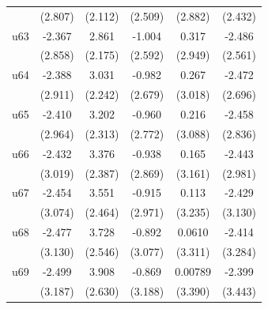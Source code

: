 \begin{table}[htbp]
\begin{tabular}{l*{5}{c}}
                    &     (2.807)         &     (2.112)         &     (2.509)         &     (2.882)         &     (2.432)         \\
\addlinespace
u63                 &      -2.367         &       2.861         &      -1.004         &       0.317         &      -2.486         \\
                    &     (2.858)         &     (2.175)         &     (2.592)         &     (2.949)         &     (2.561)         \\
\addlinespace
u64                 &      -2.388         &       3.031         &      -0.982         &       0.267         &      -2.472         \\
                    &     (2.911)         &     (2.242)         &     (2.679)         &     (3.018)         &     (2.696)         \\
\addlinespace
u65                 &      -2.410         &       3.202         &      -0.960         &       0.216         &      -2.458         \\
                    &     (2.964)         &     (2.313)         &     (2.772)         &     (3.088)         &     (2.836)         \\
\addlinespace
u66                 &      -2.432         &       3.376         &      -0.938         &       0.165         &      -2.443         \\
                    &     (3.019)         &     (2.387)         &     (2.869)         &     (3.161)         &     (2.981)         \\
\addlinespace
u67                 &      -2.454         &       3.551         &      -0.915         &       0.113         &      -2.429         \\
                    &     (3.074)         &     (2.464)         &     (2.971)         &     (3.235)         &     (3.130)         \\
\addlinespace
u68                 &      -2.477         &       3.728         &      -0.892         &      0.0610         &      -2.414         \\
                    &     (3.130)         &     (2.546)         &     (3.077)         &     (3.311)         &     (3.284)         \\
\addlinespace
u69                 &      -2.499         &       3.908         &      -0.869         &     0.00789         &      -2.399         \\
                    &     (3.187)         &     (2.630)         &     (3.188)         &     (3.390)         &     (3.443)         \\

\end{tabular}
\end{table}
